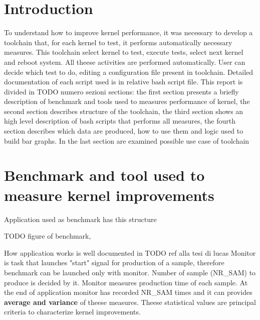 \documentclass[a4paper,10pt]{article}
\begin{document}
\vspace{4ex}	%
\begin{multicols}{2}

\section{Introduction}

To understand how to improve kernel performance, it was necessary to develop a toolchain
that, for each kernel to test, it performs automatically necessary measures.
This toolchain select kernel to test, execute tests, select next kernel and reboot system.
All theese activities are performed automatically. User can decide which test to do, 
editing a configuration file present in toolchain. Detailed documentation of each script
used is in relative bash script file.
This report is divided in TODO numero sezioni sections: the first section presents a
briefly description of benchmark and tools used to measures performance of kernel, 
the second section describes structure of the toolchain,
the third section shows an high level description of bash scripts that performs
all measures, the fourth section describes which data are produced, how to use them
and logic used to build bar graphs. In the last section are examined possible use case
of toolchain

\section{Benchmark and tool used to measure kernel improvements}

Application used as benchmark has this structure

TODO figure of benchmark, 

How application works is well documented in TODO ref alla tesi di lucas
Monitor is task that launches "start" signal for production of a sample, therefore benchmark can be launched only with
monitor. Number of sample (NR\_SAM) to produce is decided by it.
Monitor measures production time of each sample. At the end of application
monitor has recorded NR\_SAM times and it can provides \textbf{ average and variance} of theese measures. 
Theese statistical values are principal criteria to characterize kernel improvements.


\end{multicols}
\end{document}

